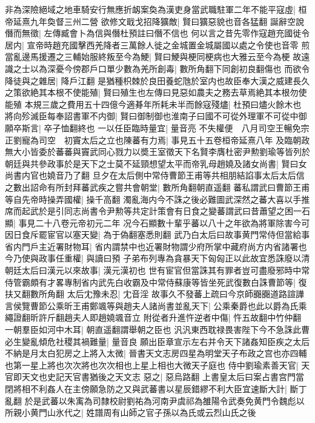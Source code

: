 非為深險絕域之地車騎安行無應折衂案奐為漢吏身當武職駐軍二年不能平寇虛|{
	桓帝延熹九年奐督三州二營}
欲修文戢戈招降獷敵|{
	賢曰獷惡貌也音各猛翻}
誕辭空說僭而無徵|{
	左傳臧會卜為信與僭杜預註曰僭不信也}
何以言之昔先零作寇趙充國徙令居内|{
	宣帝時趙充國擊西羌降者三萬餘人徙之金城置金城屬國以處之令使也音零}
煎當亂邊馬援遷之三輔始服終叛至今為鯁|{
	賢曰鯁與梗同梗病也大雅云至今為梗}
故遠識之士以為深憂今傍郡戶口單少數為羌所創毒|{
	數所角翻下同創初良翻傷也}
而欲令降徒與之雜居|{
	降戶江翻}
是猶種枳棘於良田養蛇虺於室内也故臣奉大漢之威建長久之策欲絶其本根不使能殖|{
	賢曰殖生也左傳曰見惡如農夫之務去草焉絶其本根勿使能殖}
本規三歲之費用五十四億今適朞年所耗未半而餘寇殘燼|{
	杜預曰燼火餘木也}
將向殄滅臣每奉詔書軍不内御|{
	賢曰御制御也淮南子曰國不可從外理軍不可從中御}
願卒斯言|{
	卒子恤翻終也}
一以任臣臨時量宜|{
	量音亮}
不失權便　八月司空王暢免宗正劉寵為司空　初竇太后之立也陳蕃有力焉|{
	事見五十五卷桓帝延熹八年}
及臨朝政無大小皆委於蕃蕃與竇武同心戮力以奬王室徵天下名賢李膺杜密尹勲劉瑜等皆列於朝廷與共參政事於是天下之士莫不延頸想望太平而帝乳母趙嬈及諸女尚書|{
	賢曰女尚書内官也嬈音乃了翻}
旦夕在太后側中常侍曹節王甫等共相朋結諂事太后太后信之數出詔命有所封拜蕃武疾之嘗共會朝堂|{
	數所角翻朝直遥翻}
蕃私謂武曰曹節王甫等自先帝時操弄國權|{
	操千高翻}
濁亂海内今不誅之後必難圖武深然之蕃大喜以手推席而起武於是引同志尚書令尹勲等共定計策會有日食之變蕃謂武曰昔蕭望之困一石顯|{
	事見二十八卷元帝初元二年}
况今石顯數十輩乎蕃以八十之年欲為將軍除害今可因日食斥罷宦官以塞天變|{
	為于偽翻塞悉則翻}
武乃白太后曰故事黄門常侍但當給事省内門戶主近署財物耳|{
	省内謂禁中也近署財物謂少府所掌中藏府尚方内省諸署也}
今乃使與政事任重權|{
	與讀曰預}
子弟布列專為貪暴天下匈匈正以此故宜悉誅廢以清朝廷太后曰漢元以來故事|{
	漢元漢初也}
世有宦官但當誅其有罪者豈可盡廢邪時中常侍管霸頗有才畧專制省内武先白收霸及中常侍蘇康等皆坐死武復數白誅曹節等|{
	復扶又翻數所角翻}
太后冘豫未忍|{
	冘音淫}
故事久不發蕃上疏曰今京師嚻嚻道路諠譁言侯覽曹節公乘昕王甫鄭颯等與趙夫人諸尚書並亂天下|{
	公乘秦爵也此以爵為氏乘繩證翻昕許斤翻趙夫人即趙嬈颯音立}
附從者升進忤逆者中傷|{
	忤五故翻中竹仲翻}
一朝羣臣如河中木耳|{
	朝直遥翻謂舉朝之臣也}
汎汎東西耽禄畏害陛下今不急誅此曹必生變亂傾危社稷其禍難量|{
	量音良}
願出臣章宣示左右并令天下諸姦知臣疾之太后不納是月太白犯房之上將入太微|{
	晉書天文志房四星為明堂天子布政之宫也亦四輔也第一星上將也次次將也次次相也上星上相也大微天子庭也}
侍中劉瑜素善天官|{
	天官即天文也史記天官書猶後之天文志}
惡之|{
	惡烏路翻}
上書皇太后曰案占書宫門當閉將相不利姦人在主傍願急防之又與武蕃書以星辰錯繆不利大臣宜速斷大計|{
	斷丁亂翻}
於是武蕃以朱㝢為司隸校尉劉祐為河南尹虞祁為雒陽令武奏免黄門令魏彪以所親小黄門山氷代之|{
	姓譜周有山師之官子孫以為氏或云烈山氏之後}
